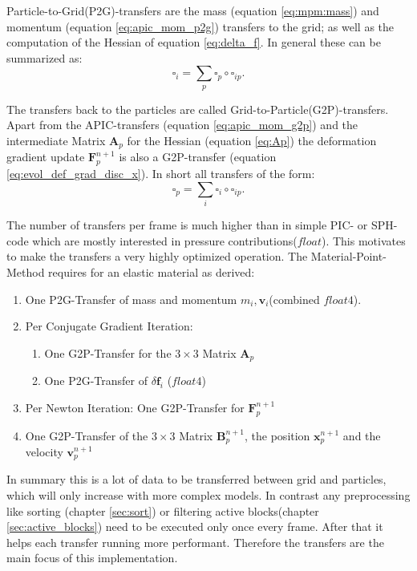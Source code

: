 \documentclass[m,times]{cgMA}
\begin{document}
Particle-to-Grid(P2G)-transfers are the mass (equation \ref{eq:mpm:mass}) and momentum (equation \ref{eq:apic_mom_p2g}) transfers to the grid; as well as the computation of the Hessian of equation \ref{eq:delta_f}. In general these can be summarized as:
$$\square_i = \sum_p \square_p \circ \square_{ip}.$$

The transfers back to the particles are called Grid-to-Particle(G2P)-transfers. Apart from the APIC-transfers (equation \ref{eq:apic_mom_g2p}) and the intermediate Matrix $\boldsymbol{A}_p$ for the Hessian (equation \ref{eq:Ap}) the deformation gradient update $\boldsymbol{F}^{n+1}_p$ is also a G2P-transfer (equation \ref{eq:evol_def_grad_disc_x}). In short all transfers of the form:
$$\square_p = \sum_i \square_i \circ \square_{ip}.$$

The number of transfers per frame is much higher than in simple PIC- or SPH-code which are mostly interested in pressure contributions($float$). This motivates to make the transfers a very highly optimized operation. The Material-Point-Method requires for an elastic material as derived:
\begin{enumerate}
  \item One P2G-Transfer of mass and momentum $m_i, \boldsymbol{v}_i$(combined $float4$).
  \item Per Conjugate Gradient Iteration:
    \begin{enumerate}
      \item One G2P-Transfer for the $3 \times 3$ Matrix $\boldsymbol{A}_p$
      \item One P2G-Transfer of $\delta \boldsymbol{f}_i$ ($float4$)
    \end{enumerate}
  \item Per Newton Iteration: One G2P-Transfer for $\boldsymbol{F}^{n+1}_p$
  \item One G2P-Transfer of the $3 \times 3$ Matrix $\boldsymbol{B}_p^{n+1}$, the position $\boldsymbol{x}_p^{n+1}$ and the velocity $\boldsymbol{v}_p^{n+1}$
\end{enumerate}
In summary this is a lot of data to be transferred between grid and particles, which will only increase with more complex models. In contrast any preprocessing like sorting (chapter \ref{sec:sort}) or filtering active blocks(chapter \ref{sec:active_blocks}) need to be executed only once every frame. After that it helps each transfer running more performant. Therefore the transfers are the main focus of this implementation.
\end{document}

